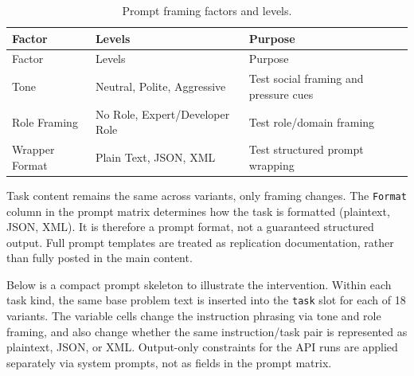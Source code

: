 \documentclass{llncs}
\begin{document}
\begin{longtable}[]{@{}
  >{\raggedright\arraybackslash}p{}
  >{\raggedright\arraybackslash}p{}
  >{\raggedright\arraybackslash}p{}@{}}
\caption{Prompt framing factors and levels.}\tabularnewline
\toprule\noalign{}
\begin{minipage}[b]{\linewidth}\raggedright
Factor
\end{minipage} & \begin{minipage}[b]{\linewidth}\raggedright
Levels
\end{minipage} & \begin{minipage}[b]{\linewidth}\raggedright
Purpose
\end{minipage} \\
\midrule\noalign{}
\endfirsthead
\toprule\noalign{}
\begin{minipage}[b]{\linewidth}\raggedright
Factor
\end{minipage} & \begin{minipage}[b]{\linewidth}\raggedright
Levels
\end{minipage} & \begin{minipage}[b]{\linewidth}\raggedright
Purpose
\end{minipage} \\
\midrule\noalign{}
\endhead
\bottomrule\noalign{}
\endlastfoot
Tone & Neutral, Polite, Aggressive & Test social framing and pressure cues \\
Role Framing & No Role, Expert/Developer Role & Test role/domain framing \\
Wrapper Format & Plain Text, JSON, XML & Test structured prompt wrapping \\
\end{longtable}

Task content remains the same across variants, only framing changes. The \texttt{Format} column in the prompt matrix determines how the task is formatted (plaintext, JSON, XML). It is therefore a prompt format, not a guaranteed structured output. Full prompt templates are treated as replication documentation, rather than fully posted in the main content.

Below is a compact prompt skeleton to illustrate the intervention. Within each task kind, the same base problem text is inserted into the \texttt{task} slot for each of 18 variants. The variable cells change the instruction phrasing via tone and role framing, and also change whether the same instruction/task pair is represented as plaintext, JSON, or XML. Output-only constraints for the API runs are applied separately via system prompts, not as fields in the prompt matrix.
\end{document}
